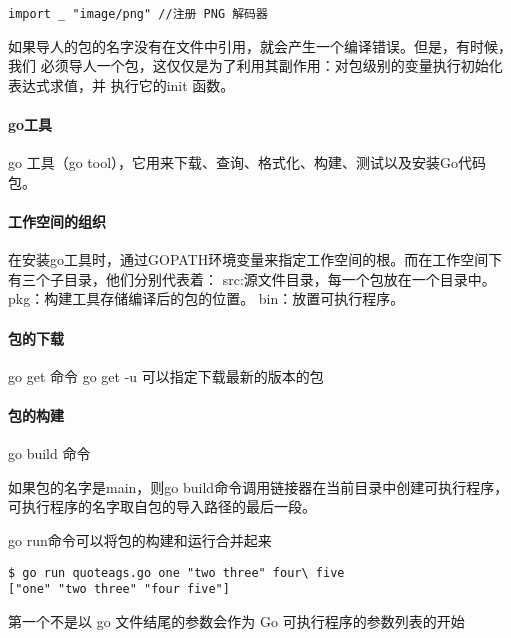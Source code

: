 \begin{verbatim}
import _ "image/png" //注册 PNG 解码器
\end{verbatim}

如果导人的包的名字没有在文件中引用，就会产生一个编译错误。但是，有时候，我们
必须导人一个包，这仅仅是为了利用其副作用：对包级别的变量执行初始化表达式求值，并
执行它的init 函数。

\hypertarget{goux5de5ux5177}{%
\paragraph{go工具}\label{goux5de5ux5177}}

go 工具（go
tool），它用来下载、查询、格式化、构建、测试以及安装Go代码包。

\hypertarget{ux5de5ux4f5cux7a7aux95f4ux7684ux7ec4ux7ec7}{%
\paragraph{工作空间的组织}\label{ux5de5ux4f5cux7a7aux95f4ux7684ux7ec4ux7ec7}}

在安装go工具时，通过GOPATH环境变量来指定工作空间的根。而在工作空间下有三个子目录，他们分别代表着：
src:源文件目录，每一个包放在一个目录中。
pkg：构建工具存储编译后的包的位置。 bin：放置可执行程序。

\hypertarget{ux5305ux7684ux4e0bux8f7d}{%
\paragraph{包的下载}\label{ux5305ux7684ux4e0bux8f7d}}

go get 命令 go get -u 可以指定下载最新的版本的包

\hypertarget{ux5305ux7684ux6784ux5efa}{%
\paragraph{包的构建}\label{ux5305ux7684ux6784ux5efa}}

go build 命令

如果包的名字是main，则go
build命令调用链接器在当前目录中创建可执行程序，可执行程序的名字取自包的导入路径的最后一段。

go run命令可以将包的构建和运行合并起来

\begin{verbatim}
$ go run quoteags.go one "two three" four\ five 
["one" "two three" "four five"]
\end{verbatim}

第一个不是以 go 文件结尾的参数会作为 Go 可执行程序的参数列表的开始

